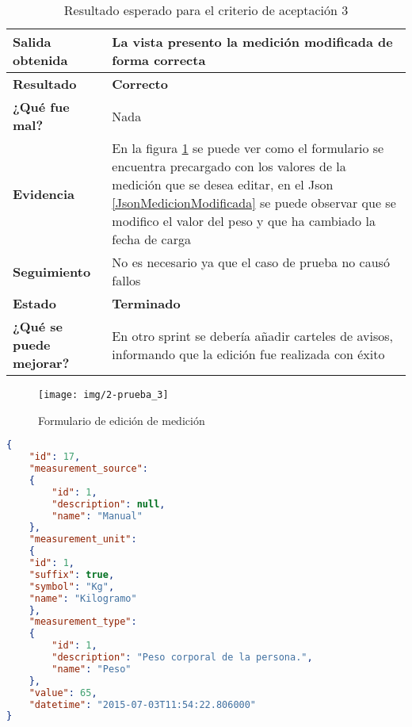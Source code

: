             {\scriptsize
	\begin{table}[h]
	\centering
	\begin{tabular}{|m{3cm}|m{10cm}|}
	    \hline 
	    \textbf{Salida obtenida}& La vista presento la medición modificada de forma correcta\\ \hline
	    \textbf{Resultado}& \textbf{Correcto}\\ \hline
        \textbf{¿Qué fue mal?}& Nada\\ \hline      
        \textbf{Evidencia}&  En la figura \ref{edicion_medicion} se puede ver como el formulario se encuentra precargado con los valores de la medición que se desea editar, en el Json \ref{JsonMedicionModificada} se puede observar que se modifico el valor del peso y que ha cambiado la fecha de carga \\ \hline
        \textbf{Seguimiento}& No es necesario ya que el caso de prueba no causó
fallos\\ \hline
        \textbf{Estado}& \textbf{Terminado}\\ \hline        
        \textbf{¿Qué se puede mejorar?}& En otro sprint se debería añadir carteles de avisos, informando que la edición fue realizada con éxito \\ \hline              
	    \end{tabular}
        \caption{Resultado esperado para el criterio de aceptación 3}
    	\end{table}
	}
\begin{figure}[h]
        \centering
        \texttt{[image: img/2-prueba\_3]}
        \caption{Formulario de edición de medición}
		\label{edicion_medicion}
\end{figure}

\begin{lstlisting}[language=json,firstnumber=1,  breaklines=true, caption= Json de las medicion modificada del perfil id:3, label=JsonMedicionModificada]
{
	"id": 17,
    "measurement_source": 
	{
    	"id": 1,
	    "description": null,
	    "name": "Manual"
	},
	"measurement_unit": 
	{
    "id": 1,
    "suffix": true,
    "symbol": "Kg",
    "name": "Kilogramo"
	},
	"measurement_type": 
    {
        "id": 1,
        "description": "Peso corporal de la persona.",
        "name": "Peso"
    },
    "value": 65,
    "datetime": "2015-07-03T11:54:22.806000"
}
\end{lstlisting}
\clearpage  

